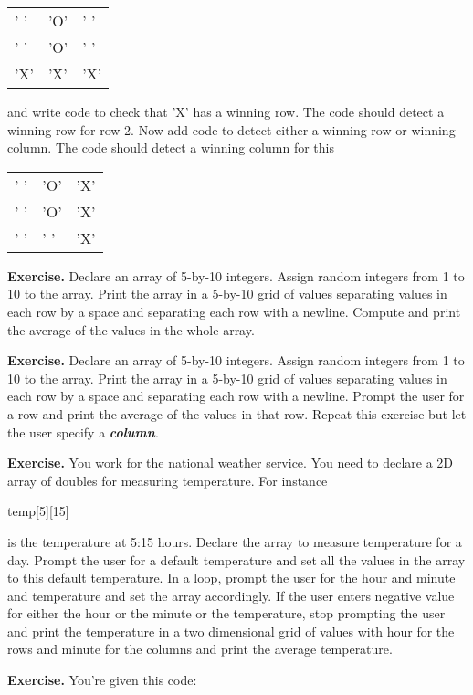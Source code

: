 \documentclass[
]{article}
\begin{document}
\begin{longtable}[]{@{}lll@{}}
\toprule
\endhead
' ' & 'O' & ' '\tabularnewline
' ' & 'O' & ' '\tabularnewline
'X' & 'X' & 'X'\tabularnewline
\bottomrule
\end{longtable}

and write code to check that 'X' has a winning row. The code should
detect a winning row for row 2. Now add code to detect either a winning
row or winning column. The code should detect a winning column for this

\begin{longtable}[]{@{}lll@{}}
\toprule
\endhead
' ' & 'O' & 'X'\tabularnewline
' ' & 'O' & 'X'\tabularnewline
' ' & ' ' & 'X'\tabularnewline
\bottomrule
\end{longtable}

\textbf{Exercise.} Declare an array of 5-by-10 integers. Assign random
integers from 1 to 10 to the array. Print the array in a 5-by-10 grid of
values separating values in each row by a space and separating each row
with a newline. Compute and print the average of the values in the whole
array.

\textbf{Exercise.} Declare an array of 5-by-10 integers. Assign random
integers from 1 to 10 to the array. Print the array in a 5-by-10 grid of
values separating values in each row by a space and separating each row
with a newline. Prompt the user for a row and print the average of the
values in that row. Repeat this exercise but let the user specify a
\emph{\textbf{column}}.

\textbf{Exercise.} You work for the national weather service. You need
to declare a 2D array of doubles for measuring temperature. For instance

temp{[}5{]}{[}15{]}

is the temperature at 5:15 hours. Declare the array to measure
temperature for a day. Prompt the user for a default temperature and set
all the values in the array to this default temperature. In a loop,
prompt the user for the hour and minute and temperature and set the
array accordingly. If the user enters negative value for either the hour
or the minute or the temperature, stop prompting the user and print the
temperature in a two dimensional grid of values with hour for the rows
and minute for the columns and print the average temperature.

\textbf{Exercise.} You're given this code:
\end{document}
